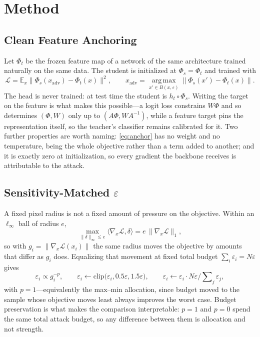 \section{Method}
\label{sec:method}

\subsection{Clean Feature Anchoring}

Let $\Phi_t$ be the frozen feature map of a network of the same architecture trained naturally on the
same data. The student is initialized at $\Phi_s=\Phi_t$ and trained with
\begin{equation}
\mathcal{L}=\mathbb{E}_x\big\lVert\Phi_s(x_{\mathrm{adv}})-\Phi_t(x)\big\rVert^2,
\qquad
x_{\mathrm{adv}}=\operatorname*{arg\,max}_{x'\in B(x,\varepsilon)}\big\lVert\Phi_s(x')-\Phi_t(x)\big\rVert.
\label{eq:anchor}
\end{equation}
The head is never trained: at test time the student is $h_t\circ\Phi_s$. Writing the target on the
feature is what makes this possible---a logit loss constrains $W\Phi$ and so determines $(\Phi,W)$
only up to $(A\Phi,WA^{-1})$, while a feature target pins the representation itself, so the teacher's
classifier remains calibrated for it. Two further properties are worth naming: \eqref{eq:anchor} has
no weight and no temperature, being the whole objective rather than a term added to another; and it is
exactly zero at initialization, so every gradient the backbone receives is attributable to the attack.

\subsection{Sensitivity-Matched $\varepsilon$}
\label{sec:angeps}

A fixed pixel radius is not a fixed amount of pressure on the objective. Within an $\ell_\infty$ ball
of radius $e$,
\begin{equation}
\max_{\lVert\delta\rVert_\infty\le e}\langle\nabla_x\mathcal{L},\delta\rangle
=e\,\lVert\nabla_x\mathcal{L}\rVert_1,
\label{eq:firstorder}
\end{equation}
so with $g_i=\lVert\nabla_x\mathcal{L}(x_i)\rVert$ the same radius moves the objective by amounts that
differ as $g_i$ does. Equalizing that movement at fixed total budget $\sum_i\varepsilon_i=N\varepsilon$
gives
\begin{equation}
\varepsilon_i\propto g_i^{-p},\qquad
\varepsilon_i\leftarrow\mathrm{clip}\big(\varepsilon_i,0.5\varepsilon,1.5\varepsilon\big),\qquad
\varepsilon_i\leftarrow\varepsilon_i\cdot N\varepsilon\Big/\sum\nolimits_j\varepsilon_j,
\label{eq:angeps}
\end{equation}
with $p=1$---equivalently the max--min allocation, since budget moved to the sample whose objective
moves least always improves the worst case. Budget preservation is what makes the comparison
interpretable: $p{=}1$ and $p{=}0$ spend the same total attack budget, so any difference between them
is allocation and not strength.

